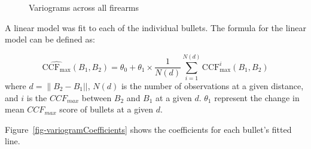 \documentclass[
  12pt]{article}
\begin{document}
\begin{figure}[H]


\caption{\label{fig-variograms}Variograms across all firearms}

\end{figure}%

A linear model was fit to each of the individual bullets. The formula
for the linear model can be defined as:

\[
\widehat{\text{CCF}_{\max}}(B_1, B_2) = \theta_0 + \theta_1 \times \frac{1}{N(d)} \sum_{i=1}^{N(d)} \text{CCF}_{\max}^i(B_1, B_2)
\] where \(d = \lVert B_2 - B_1 ||\), \(N(d)\) is the number of
observations at a given distance, and \(i\) is the \(CCF_{max}\) between
\(B_2\) and \(B_1\) at a given \(d\). \(\theta_1\) represent the change
in mean \(CCF_{max}\) score of bullets at a given \(d\).

Figure~\ref{fig-variogramCoefficients} shows the coefficients for each
bullet's fitted line.
\end{document}
